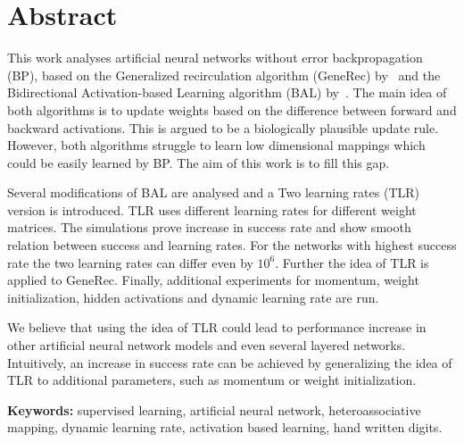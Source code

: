 
\section*{Abstract}

This work analyses artificial neural networks without error backpropagation (BP), based on the Generalized recirculation algorithm (GeneRec) by~\citet{o1996bio} and the Bidirectional Activation-based Learning algorithm (BAL) by~\citet{farkas2013bal}. The main idea of both algorithms is to update weights based on the difference between forward and backward activations. This is argued to be a biologically plausible update rule. However, both algorithms struggle to learn low dimensional mappings which could be easily learned by BP. The aim of this work is to fill this gap. 

Several modifications of BAL are analysed and a Two learning rates (TLR) version is introduced. TLR uses different learning rates for different weight matrices. The simulations prove increase in success rate and show smooth relation between success and learning rates. For the networks with highest success rate the two learning rates can differ even by $10^6$. Further the idea of TLR is applied to GeneRec. Finally, additional experiments for momentum, weight initialization, hidden activations and dynamic learning rate are run. 

We believe that using the idea of TLR could lead to performance increase in other artificial neural network models and even several layered networks. Intuitively, an increase in success rate can be achieved by generalizing the idea of TLR to additional parameters, such as momentum or weight initialization. 

\begin{flushleft}
  \textbf{Keywords:} supervised learning, artificial neural network, heteroassociative mapping, dynamic learning rate, activation based learning, hand written digits. 
\end{flushleft}


